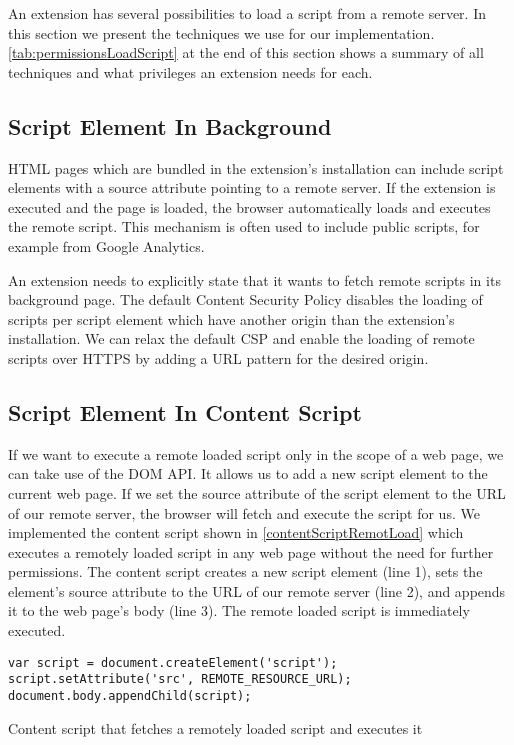 	An extension has several possibilities to load a script from a remote server. In this section we present the techniques we use for our implementation. \autoref{tab:permissionsLoadScript} at the end of this section shows a summary of all techniques and what privileges an extension needs for each. 
		
\subsection{Script Element In Background}
	
	HTML pages which are bundled in the extension's installation can include script elements with a source attribute pointing to a remote server. If the extension is executed and the page is loaded, the browser automatically loads and executes the remote script. This mechanism is often used to include public scripts, for example from Google Analytics. 
	
	An extension needs to explicitly state that it wants to fetch remote scripts in its background page. The default Content Security Policy disables the loading of scripts per script element which have another origin than the extension's installation. We can relax the default CSP and enable the loading of remote scripts over HTTPS by adding a URL pattern for the desired origin. 
	
\subsection{Script Element In Content Script}

	If we want to execute a remote loaded script only in the scope of a web page, we can take use of the DOM API. It allows us to add a new script element to the current web page. If we set the source attribute of the script element to the URL of our remote server, the browser will fetch and execute the script for us. We implemented the content script shown in \autoref{contentScriptRemotLoad} which executes a remotely loaded script in any web page without the need for further permissions. The content script creates a new script element (line 1), sets the element's source attribute to the URL of our remote server (line 2), and appends it to the web page's body (line 3). The remote loaded script is immediately executed.
	
	\begin{code}
		\begin{lstlisting}	
var script = document.createElement('script');
script.setAttribute('src', REMOTE_RESOURCE_URL);
document.body.appendChild(script);
\end{lstlisting}
		\caption{Content script that fetches a remotely loaded script and executes it}
		\label{contentScriptRemotLoad}
	\end{code}
	
